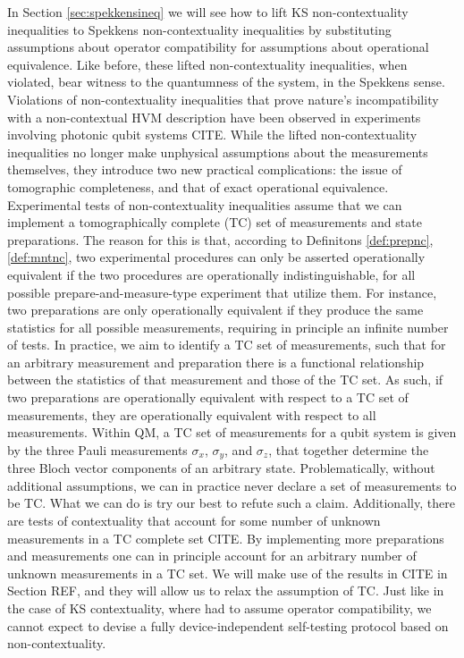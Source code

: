 In Section \ref{sec:spekkensineq} we will see how to lift KS non-contextuality inequalities to Spekkens non-contextuality inequalities by substituting assumptions about operator compatibility for assumptions about operational equivalence. Like before, these lifted non-contextuality inequalities, when violated, bear witness to the quantumness of the system, in the Spekkens sense. Violations of non-contextuality inequalities that prove nature's incompatibility with a non-contextual HVM description have been observed in experiments involving photonic qubit systems CITE. While the lifted non-contextuality inequalities no longer make unphysical assumptions about the measurements themselves, they introduce two new practical complications: the issue of tomographic completeness, and that of exact operational equivalence. Experimental tests of non-contextuality inequalities assume that we can implement a tomographically complete (TC) set of measurements and state preparations. The reason for this is that, according to Definitons \ref{def:prepnc}, \ref{def:mntnc}, two experimental procedures can only be asserted operationally equivalent if the two procedures are operationally indistinguishable, for all possible prepare-and-measure-type experiment that utilize them. For instance, two preparations are only operationally equivalent if they produce the same statistics for all possible measurements, requiring in principle an infinite number of tests. In practice, we aim to identify a TC set of measurements, such that for an arbitrary measurement and preparation there is a functional relationship between the statistics of that measurement and those of the TC set. As such, if two preparations are operationally equivalent with respect to a TC set of measurements, they are operationally equivalent with respect to all measurements. Within QM, a TC set of measurements for a qubit system is given by the three Pauli measurements $\sigma_x$, $\sigma_y$, and $\sigma_z$, that together determine the three Bloch vector components of an arbitrary state. Problematically, without additional assumptions, we can in practice never declare a set of measurements to be TC. What we can do is try our best to refute such a claim. Additionally, there are tests of contextuality that account for some number of unknown measurements in a TC complete set CITE. By implementing more preparations and measurements one can in principle account for an arbitrary number of unknown measurements in a TC set. We will make use of the results in CITE in Section REF, and they will allow us to relax the assumption of TC. Just like in the case of KS contextuality, where had to assume operator compatibility, we cannot expect to devise a fully device-independent self-testing protocol based on non-contextuality. 

